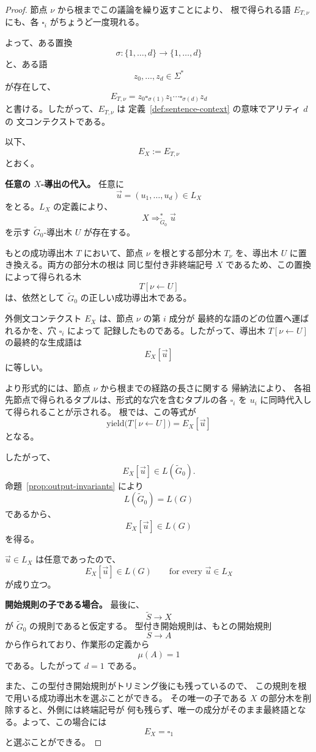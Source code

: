 \documentclass[11pt,a4paper]{ltjsarticle}
\theoremstyle{remark}
\newcommand{\tuple}[1]{\vec{#1}}
\newcommand{\blank}{\square}
\newcommand{\yield}{\mathrm{yield}}
\begin{document}
\begin{proof}
節点 \(\nu\) から根までこの議論を繰り返すことにより、
根で得られる語 \(E_{T,\nu}\) にも、各
\(\blank_i\) がちょうど一度現れる。

よって、ある置換
\[
  \sigma\colon\{1,\ldots,d\}\to\{1,\ldots,d\}
\]
と、ある語
\[
  z_0,\ldots,z_d\in\Sigma^*
\]
が存在して、
\[
  E_{T,\nu}
  =
  z_0\blank_{\sigma(1)}z_1
  \cdots
  \blank_{\sigma(d)}z_d
\]
と書ける。したがって、\(E_{T,\nu}\) は
定義~\ref{def:sentence-context} の意味でアリティ \(d\) の
文コンテクストである。

以下、
\[
  E_X:=E_{T,\nu}
\]
とおく。

\medskip
\noindent
\textbf{任意の \(X\)-導出の代入。}
任意に
\[
  \tuple u=(u_1,\ldots,u_d)\in L_X
\]
をとる。\(L_X\) の定義により、
\[
  X\Rightarrow_{\widetilde G_0}^*\tuple u
\]
を示す \(\widetilde G_0\)-導出木 \(U\) が存在する。

もとの成功導出木 \(T\) において、節点 \(\nu\) を根とする部分木
\(T_\nu\) を、導出木 \(U\) に置き換える。両方の部分木の根は
同じ型付き非終端記号 \(X\) であるため、この置換によって得られる木
\[
  T[\nu\leftarrow U]
\]
は、依然として \(\widetilde G_0\) の正しい成功導出木である。

外側文コンテクスト \(E_X\) は、節点 \(\nu\) の第 \(i\) 成分が
最終的な語のどの位置へ運ばれるかを、穴 \(\blank_i\) によって
記録したものである。したがって、導出木
\(T[\nu\leftarrow U]\) の最終的な生成語は
\[
  E_X[\tuple u]
\]
に等しい。

より形式的には、節点 \(\nu\) から根までの経路の長さに関する
帰納法により、
各祖先節点で得られるタプルは、形式的な穴を含むタプルの各
\(\blank_i\) を \(u_i\) に同時代入して得られることが示される。
根では、この等式が
\[
  \yield\bigl(T[\nu\leftarrow U]\bigr)
  =
  E_X[\tuple u]
\]
となる。

したがって、
\[
  E_X[\tuple u]\in L(\widetilde G_0).
\]
命題~\ref{prop:output-invariants} により
\[
  L(\widetilde G_0)=L(G)
\]
であるから、
\[
  E_X[\tuple u]\in L(G)
\]
を得る。

\(\tuple u\in L_X\) は任意であったので、
\[
  E_X[\tuple u]\in L(G)
  \qquad
  \text{for every }\tuple u\in L_X
\]
が成り立つ。

\medskip
\noindent
\textbf{開始規則の子である場合。}
最後に、
\[
  \widetilde S\to X
\]
が \(\widetilde G_0\) の規則であると仮定する。
型付き開始規則は、もとの開始規則
\[
  S\to A
\]
から作られており、作業形の定義から
\[
  \mu(A)=1
\]
である。したがって \(d=1\) である。

また、この型付き開始規則がトリミング後にも残っているので、
この規則を根で用いる成功導出木を選ぶことができる。
その唯一の子である \(X\) の部分木を削除すると、外側には終端記号が
何も残らず、唯一の成分がそのまま最終語となる。よって、この場合には
\[
  E_X=\blank_1
\]
と選ぶことができる。
\end{proof}
\end{document}

